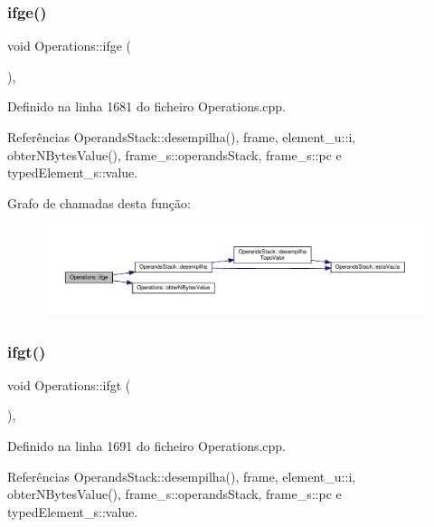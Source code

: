 \subsubsection{\texorpdfstring{ifge()}{ifge()}}
{\footnotesize\ttfamily void Operations\+::ifge (\begin{DoxyParamCaption}{ }\end{DoxyParamCaption})\hspace{0.3cm}{\ttfamily [static]}, {\ttfamily [private]}}



Definido na linha 1681 do ficheiro Operations.\+cpp.



Referências Operands\+Stack\+::desempilha(), frame, element\+\_\+u\+::i, obter\+N\+Bytes\+Value(), frame\+\_\+s\+::operands\+Stack, frame\+\_\+s\+::pc e typed\+Element\+\_\+s\+::value.

Grafo de chamadas desta função\+:\nopagebreak
\begin{figure}[H]
\begin{center}
\leavevmode
\includegraphics[width=350pt]{classOperations_a0e7cf2111ad25ee52aa329cc6ec4d38a_cgraph}
\end{center}
\end{figure}
\mbox{\label{classOperations_afff52b972f58750ea8037aeb02dd22bc}} 
\subsubsection{\texorpdfstring{ifgt()}{ifgt()}}
{\footnotesize\ttfamily void Operations\+::ifgt (\begin{DoxyParamCaption}{ }\end{DoxyParamCaption})\hspace{0.3cm}{\ttfamily [static]}, {\ttfamily [private]}}



Definido na linha 1691 do ficheiro Operations.\+cpp.



Referências Operands\+Stack\+::desempilha(), frame, element\+\_\+u\+::i, obter\+N\+Bytes\+Value(), frame\+\_\+s\+::operands\+Stack, frame\+\_\+s\+::pc e typed\+Element\+\_\+s\+::value.

